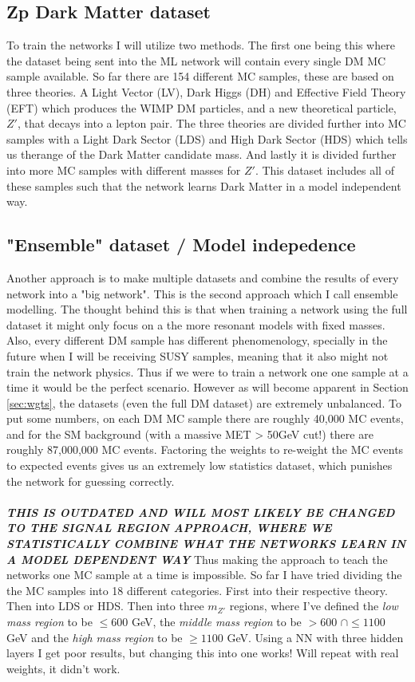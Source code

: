 \documentclass[12pt, a4paper]{book}
\begin{document}
\subsection*{Zp Dark Matter dataset}
To train the networks I will utilize two methods. The first one being this where the dataset being sent into the ML network will contain every single DM MC sample available. 
So far there are 154 different MC samples, these are based on three theories. A Light Vector (LV), Dark Higgs (DH) and Effective Field Theory (EFT) which produces the WIMP DM particles, and a new theoretical particle, $Z'$, 
that decays into a lepton pair. The three theories are divided further into MC samples with a Light Dark Sector (LDS) and High Dark Sector (HDS) which tells us therange of the Dark Matter candidate mass. 
And lastly it is divided further into more MC samples with different masses for $Z'$. This dataset includes all of these samples such that the network learns Dark Matter in a model independent way.

\subsection*{"Ensemble" dataset / Model indepedence}
Another approach is to make multiple datasets and combine the results of every network into a "big network". This is the second approach which I call ensemble modelling. The thought behind this is that when 
training a network using the full dataset it might only focus on a the more resonant models with fixed masses. Also, every different DM sample has different phenomenology, specially in the future when I will 
be receiving SUSY samples, meaning that it also might not train the network physics. Thus if we were to train a network one one sample at a time it would be the perfect scenario. 
However as will become apparent in Section \ref{sec:wgts}, the datasets (even the full DM dataset) are extremely unbalanced. To put some numbers, on each DM MC sample there are roughly 40,000 MC events, 
and for the SM background (with a massive MET > 50GeV cut!) there are roughly 87,000,000 MC events. Factoring the weights to re-weight the MC events to expected events gives us an extremely low statistics dataset, which punishes the network for guessing correctly. \\
\\\textit{\textbf{THIS IS OUTDATED AND WILL MOST LIKELY BE CHANGED TO THE SIGNAL REGION APPROACH, WHERE WE STATISTICALLY COMBINE WHAT THE NETWORKS LEARN IN A MODEL DEPENDENT WAY}} Thus making the approach to teach the networks one MC sample at a time is impossible. So far I have tried dividing the the MC samples into 18 different categories. First into their respective theory. 
Then into LDS or HDS. Then into three $m_{Z'}$ regions, where I've defined the \textit{low mass region} to be $\le 600$ GeV, the \textit{middle mass region} to be $>600$ $\cap\le 1100$ GeV and 
the\textit{ high mass region }to be $\ge 1100$ GeV. Using a NN with three hidden layers I get poor results, but changing this into one works! Will repeat with real weights, it didn't work. 
\end{document}
